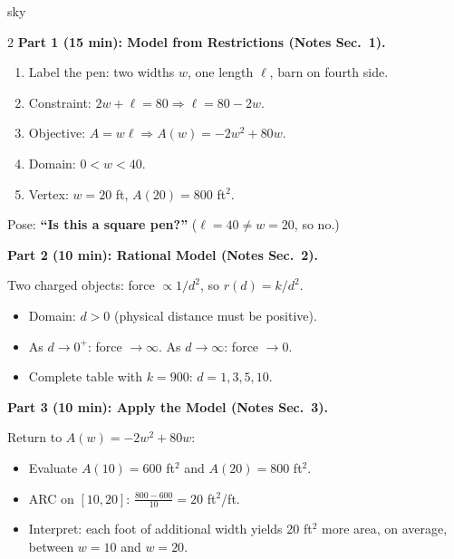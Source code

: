 \documentclass[10pt]{article}
\begin{document}
\begin{skillbox}[Lesson]{sky}
\begin{multicols}{2}
\textbf{Part 1 (15 min): Model from Restrictions (Notes Sec.\ 1).}

\begin{enumerate}[leftmargin=1.2em,itemsep=2pt,topsep=2pt]
  \item Label the pen: two widths $w$, one length $\ell$, barn on fourth side.
  \item Constraint: $2w + \ell = 80 \Rightarrow \ell = 80 - 2w$.
  \item Objective: $A = w\ell \Rightarrow A(w) = -2w^2 + 80w$.
  \item Domain: $0 < w < 40$.
  \item Vertex: $w = 20$ ft, $A(20) = 800$ ft$^2$.
\end{enumerate}

Pose: \textbf{``Is this a square pen?''} ($\ell = 40 \ne w = 20$, so no.)

\columnbreak

\textbf{Part 2 (10 min): Rational Model (Notes Sec.\ 2).}

Two charged objects: force $\propto 1/d^2$, so $r(d) = k/d^2$.
\begin{itemize}[leftmargin=1.2em,itemsep=2pt,topsep=2pt]
  \item Domain: $d > 0$ (physical distance must be positive).
  \item As $d \to 0^+$: force $\to \infty$. As $d \to \infty$: force $\to 0$.
  \item Complete table with $k = 900$: $d = 1, 3, 5, 10$.
\end{itemize}

\textbf{Part 3 (10 min): Apply the Model (Notes Sec.\ 3).}

Return to $A(w) = -2w^2 + 80w$:
\begin{itemize}[leftmargin=1.2em,itemsep=2pt,topsep=2pt]
  \item Evaluate $A(10) = 600$ ft$^2$ and $A(20) = 800$ ft$^2$.
  \item ARC on $[10, 20]$: $\frac{800-600}{10} = 20$ ft$^2$/ft.
  \item Interpret: each foot of additional width yields 20 ft$^2$ more area, on average, between
        $w = 10$ and $w = 20$.
\end{itemize}
\end{multicols}
\end{skillbox}
\end{document}
